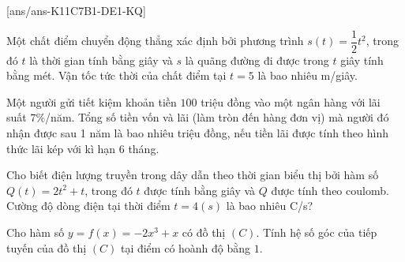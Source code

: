 

[ans/ans-K11C7B1-DE1-KQ]
\caukq
\begin{ex}%
Một chất điểm chuyển động thẳng xác định bởi phương trình $s(t)=\dfrac{1}{2} t^2$, trong đó $t$ là thời gian tính bằng giây và $s$ là quãng đường đi được trong $t$ giây tính bằng mét. Vận tốc tức thời của chất điểm tại $t=5$ là bao nhiêu m/giây.
\end{ex}

\begin{ex}%
Một người gửi tiết kiệm khoản tiền $ 100 $ triệu đồng vào một ngân hàng với lãi suất $7 \% $/năm. Tổng số tiền vốn và lãi (làm tròn đến hàng đơn vị) mà người đó nhận được sau 1 năm là bao nhiêu triệu đồng, nếu tiền lãi được tính theo hình thức lãi kép với kì hạn 6 tháng.
\end{ex}

\begin{ex}%
Cho biết điện lượng truyền trong dây dẫn theo thời gian biểu thị bởi hàm số $Q(t)=2 t^2+t$, trong đó $t$ được tính bằng giây và $Q$ được tính theo coulomb. Cường độ dòng điện tại thời điểm $t=4(s)$ là bao nhiêu C/s?
\end{ex}

\begin{ex}%
Cho hàm số $y=f(x)=-2 x^3+x$ có đồ thị $(C)$.
Tính hệ số góc của tiếp tuyến của đồ thị $(C)$ tại điểm có hoành độ bằng $ 1 $.
\end{ex}


